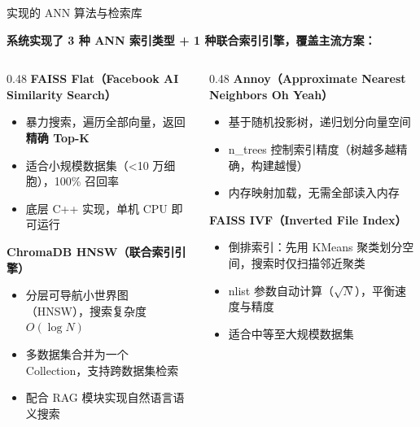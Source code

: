 \documentclass[aspectratio=169]{beamer}
\begin{document}
\begin{frame}{实现的 ANN 算法与检索库}
\fontsize{8}{10}\selectfont

\vspace{0.3em}
\textbf{系统实现了 3 种 ANN 索引类型 + 1 种联合索引引擎，覆盖主流方案：}

\vspace{0.3em}
\begin{columns}[T]
  \begin{column}{0.48\textwidth}
    \textbf{FAISS Flat（Facebook AI Similarity Search）}
    \begin{itemize}
      \item 暴力搜索，遍历全部向量，返回\textbf{精确 Top-K}
      \item 适合小规模数据集（<10 万细胞），100\% 召回率
      \item 底层 C++ 实现，单机 CPU 即可运行
    \end{itemize}

    \vspace{0.3em}
    \textbf{ChromaDB HNSW（联合索引引擎）}
    \begin{itemize}
      \item 分层可导航小世界图（HNSW），搜索复杂度 $O(\log N)$
      \item 多数据集合并为一个 Collection，支持跨数据集检索
      \item 配合 RAG 模块实现自然语言语义搜索
    \end{itemize}
  \end{column}

  \begin{column}{0.48\textwidth}
    \textbf{Annoy（Approximate Nearest Neighbors Oh Yeah）}
    \begin{itemize}
      \item 基于随机投影树，递归划分向量空间
      \item n\_trees 控制索引精度（树越多越精确，构建越慢）
      \item 内存映射加载，无需全部读入内存
    \end{itemize}

    \vspace{0.3em}
    \textbf{FAISS IVF（Inverted File Index）}
    \begin{itemize}
      \item 倒排索引：先用 KMeans 聚类划分空间，搜索时仅扫描邻近聚类
      \item nlist 参数自动计算（$\sqrt{N}$），平衡速度与精度
      \item 适合中等至大规模数据集
    \end{itemize}
  \end{column}
\end{columns}


\end{frame}
\end{document}
